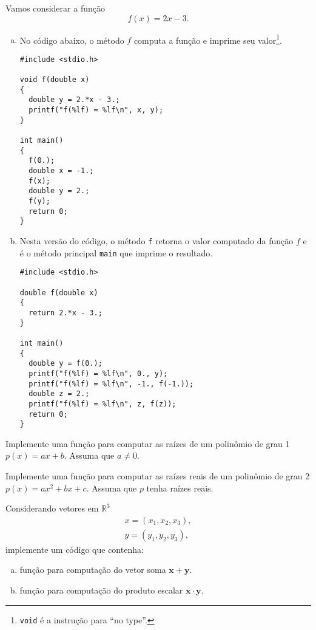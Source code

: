 \documentclass[12pt]{article}
\begin{document}
\begin{ex}
  Vamos considerar a função
  \begin{equation}
    f(x) = 2x - 3.
  \end{equation}

  \begin{enumerate}[a)]
  \item No código abaixo, o método $f$ computa a função e imprime seu valor\footnote{\lstinline+void+ é a instrução para ``no type''.}.
\begin{lstlisting}[caption=method.cc]
#include <stdio.h>

void f(double x)
{
  double y = 2.*x - 3.;
  printf("f(%lf) = %lf\n", x, y);
}

int main()
{
  f(0.);
  double x = -1.;
  f(x);
  double y = 2.;
  f(y);
  return 0;
}      
\end{lstlisting}

  \item Nesta versão do código, o método \lstinline+f+ retorna o valor computado da função $f$ e é o método principal \lstinline+main+ que imprime o resultado.
\begin{lstlisting}
#include <stdio.h>

double f(double x)
{
  return 2.*x - 3.;
}

int main()
{
  double y = f(0.);
  printf("f(%lf) = %lf\n", 0., y);
  printf("f(%lf) = %lf\n", -1., f(-1.));
  double z = 2.;
  printf("f(%lf) = %lf\n", z, f(z));
  return 0;
}
\end{lstlisting}
  \end{enumerate}  
\end{ex}

\begin{exr}
  Implemente uma função para computar as raízes de um polinômio de grau 1 $p(x) = ax + b$. Assuma que $a\neq 0$.
\end{exr}

\begin{exr}
  Implemente uma função para computar as raízes reais de um polinômio de grau 2 $p(x) = ax^2 + bx + c$. Assuma que $p$ tenha raízes reais.
\end{exr}

\begin{exr}
  Considerando vetores em $\mathbb{R}^3$
  \begin{gather}
    x = (x_1, x_2, x_3),\\
    y = (y_1, y_2, y_3),
  \end{gather}
  implemente um código que contenha:
  \begin{enumerate}[a)]
  \item função para computação do vetor soma $\pmb{x}+\pmb{y}$.
  \item função para computação do produto escalar $\pmb{x}\cdot\pmb{y}$.
  \end{enumerate}
\end{exr}
\end{document}
